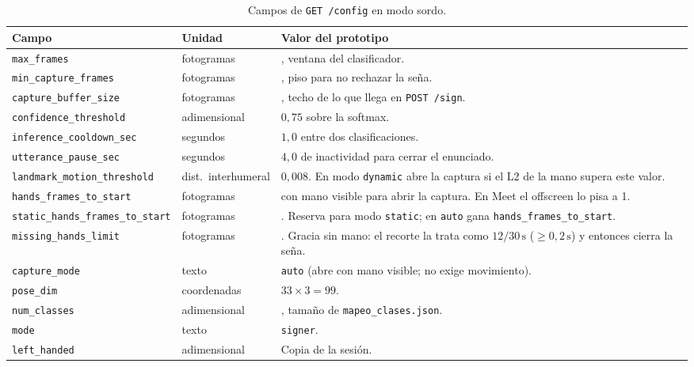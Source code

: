 \begin{table}[H]
  \centering
  \caption{Campos de \texttt{GET /config} en modo sordo.}
  \label{tab:api-local-config}
  \small
  \begin{tabularx}{\textwidth}{@{}>{\raggedright\arraybackslash}p{5.15cm} l >{\raggedright\arraybackslash}X@{}}
    \toprule
    \textbf{Campo} & \textbf{Unidad} & \textbf{Valor del prototipo} \\
    \midrule
    \texttt{max\_frames} & fotogramas & 16, ventana del clasificador. \\
    \texttt{min\_capture\_frames} & fotogramas & 5, piso para no rechazar la seña. \\
    \texttt{capture\_buffer\_size} & fotogramas & 60, techo de lo que llega en \texttt{POST /sign}. \\
    \texttt{confidence\_threshold} & adimensional & $0{,}75$ sobre la softmax. \\
    \texttt{inference\_cooldown\_sec} & segundos & $1{,}0$ entre dos clasificaciones. \\
    \texttt{utterance\_pause\_sec} & segundos & $4{,}0$ de inactividad para cerrar el enunciado. \\
    \texttt{landmark\_motion\_threshold} & dist.\ interhumeral & $0{,}008$. En modo \texttt{dynamic} abre la captura si el L2 de la mano supera este valor. \\
    \texttt{hands\_frames\_to\_start} & fotogramas & 2 con mano visible para abrir la captura. En Meet el offscreen lo pisa a 1. \\
    \texttt{static\_hands\_frames\_to\_start} & fotogramas & 4. Reserva para modo \texttt{static}; en \texttt{auto} gana \texttt{hands\_frames\_to\_start}. \\
    \texttt{missing\_hands\_limit} & fotogramas & 12. Gracia sin mano: el recorte la trata como $12/30\,\mathrm{s}$ ($\geq 0{,}2\,\mathrm{s}$) y entonces cierra la seña. \\
    \texttt{capture\_mode} & texto & \texttt{auto} (abre con mano visible; no exige movimiento). \\
    \texttt{pose\_dim} & coordenadas & $33 \times 3 = 99$. \\
    \texttt{num\_classes} & adimensional & 100, tamaño de \texttt{mapeo\_clases.json}. \\
    \texttt{mode} & texto & \texttt{signer}. \\
    \texttt{left\_handed} & adimensional & Copia de la sesión. \\
    \bottomrule
  \end{tabularx}
\end{table}

